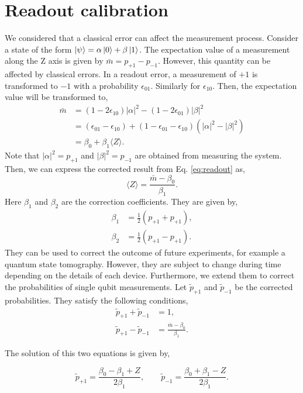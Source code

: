 \section{Readout calibration}
We considered that a classical error can affect the measurement process. Consider a state of the form $\ket{\psi} = \alpha\ket{0}+\beta\ket{1}$. The expectation value of a measurement along the Z axis is given by $\bar{m}=p_{+1}-p_{-1}$. However, this quantity can be affected by classical errors. 
In a readout error, a measurement of $+1$ is transformed to $-1$ with a probability $\epsilon_{01}$. Similarly for $\epsilon_{10}$. Then, the expectation value will be transformed to,
\begin{align}\label{eq:readout}
\bar{m} &= (1-2\epsilon_{10})|\alpha|^2-(1-2\epsilon_{01})|\beta|^2\\
&=(\epsilon_{01}-\epsilon_{10})+(1-\epsilon_{01}-\epsilon_{10})(|\alpha|^2-|\beta|^2)\\
&= \beta_0 + \beta_1 \langle Z\rangle.
\end{align}
Note that $|\alpha|^2=p_{+1}$ and $|\beta|^2=p_{-1}$ are obtained from measuring the system. Then, we can express the corrected result from Eq. \eqref{eq:readout} as,
\begin{equation}
\langle Z\rangle = \frac{\bar{m}-\beta_0}{\beta_1}.
\end{equation}
Here $\beta_1$ and $\beta_2$ are the correction coefficients. They are given by,
\begin{align}\label{eq:betas}
\beta_1 &= \frac{1}{2} (p_{+1}+p_{+1}),\\
\beta_2 &= \frac{1}{2} (p_{+1}-p_{+1}).
\end{align}
They can be used to correct the outcome of future experiments, for example a quantum state tomography. However, they are subject to change during time depending on the details of each device. Furthermore, we extend them to correct the probabilities of single qubit measurements. Let $\tilde{p}_{+1}$ and $\tilde{p}_{-1}$ be the corrected probabilities. They satisfy the following conditions,
\begin{align}
\tilde{p}_{+1}+\tilde{p}_{-1} &= 1,\\
\tilde{p}_{+1}-\tilde{p}_{-1} & = \frac{\bar{m}-\beta_0}{\beta_1}.
\end{align}

The solution of this two equations is given by,

\begin{equation}\label{eq:corrected_ps}
\tilde{p}_{+1} = \frac{\beta_0 - \beta_1 +Z}{2\beta_1},\qquad \tilde{p}_{-1} = \frac{\beta_0 + \beta_1 -Z}{2\beta_1}.
\end{equation}

